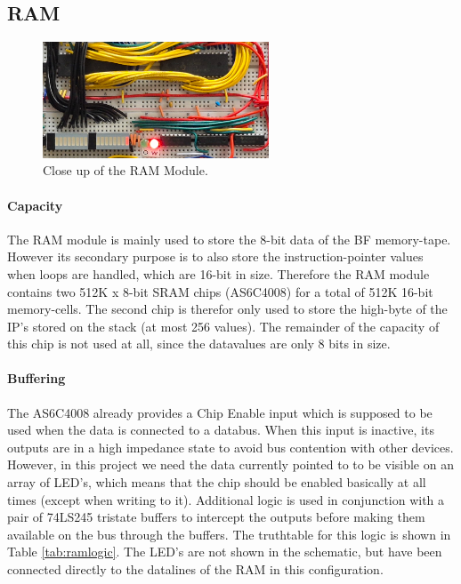
\newpage\subsection{RAM}
\begin{figure}[H]
  \centering
  \includegraphics[width=0.6\textwidth]{img/ramcloseup}
  \caption{Close up of the RAM Module.}
  \label{fig:ramcloseup}
\end{figure}

\paragraph{Capacity} The RAM module is mainly used to store the 8-bit data of the BF memory-tape. However its secondary purpose is to also store the instruction-pointer values when loops are handled, which are 16-bit in size. Therefore the RAM module contains two 512K x 8-bit SRAM chips (AS6C4008) for a total of 512K 16-bit memory-cells. The second chip is therefor only used to store the high-byte of the IP's stored on the stack (at most 256 values). The remainder of the capacity of this chip is not used at all, since the datavalues are only 8 bits in size.

\paragraph{Buffering} The AS6C4008 already provides a Chip Enable input which is supposed to be used when the data is connected to a databus. When this input is inactive, its outputs are in a high impedance state to avoid bus contention with other devices. However, in this project we need the data currently pointed to to be visible on an array of LED's, which means that the chip should be enabled basically at all times (except when writing to it). Additional logic is used in conjunction with a pair of 74LS245 tristate buffers to intercept the outputs before making them available on the bus through the buffers. The truthtable for this logic is shown in Table \ref{tab:ramlogic}. The LED's are not shown in the schematic, but have been connected directly to the datalines of the RAM in this configuration. 

